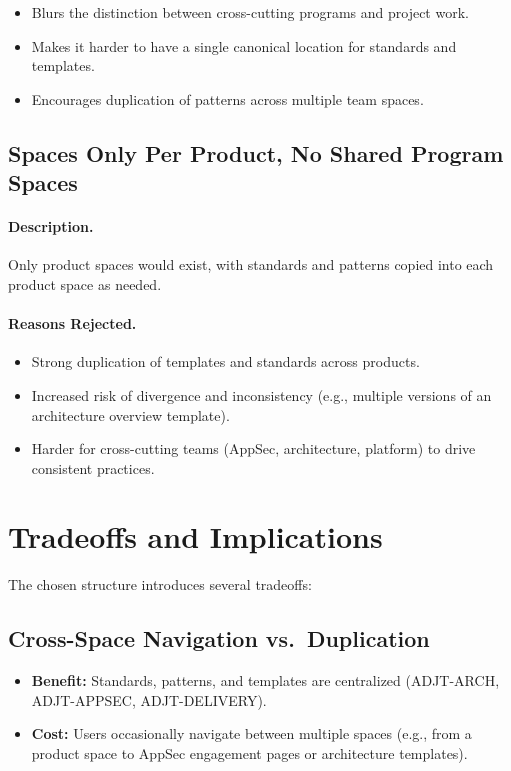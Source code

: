 \documentclass[11pt]{article}
\begin{document}
\begin{itemize}[leftmargin=*]
  \item Blurs the distinction between cross-cutting programs and
        project work.
  \item Makes it harder to have a single canonical location for
        standards and templates.
  \item Encourages duplication of patterns across multiple team
        spaces.
\end{itemize}

\subsection{Spaces Only Per Product, No Shared Program Spaces}

\paragraph{Description.}
Only product spaces would exist, with standards and patterns copied
into each product space as needed.

\paragraph{Reasons Rejected.}

\begin{itemize}[leftmargin=*]
  \item Strong duplication of templates and standards across
        products.
  \item Increased risk of divergence and inconsistency (e.g., multiple
        versions of an architecture overview template).
  \item Harder for cross-cutting teams (AppSec, architecture,
        platform) to drive consistent practices.
\end{itemize}

\section{Tradeoffs and Implications}

The chosen structure introduces several tradeoffs:

\subsection{Cross-Space Navigation vs.\ Duplication}

\begin{itemize}[leftmargin=*]
  \item \textbf{Benefit:} Standards, patterns, and templates are
        centralized (ADJT-ARCH, ADJT-APPSEC, ADJT-DELIVERY).
  \item \textbf{Cost:} Users occasionally navigate between multiple
        spaces (e.g., from a product space to AppSec engagement pages
        or architecture templates).
\end{itemize}
\end{document}
